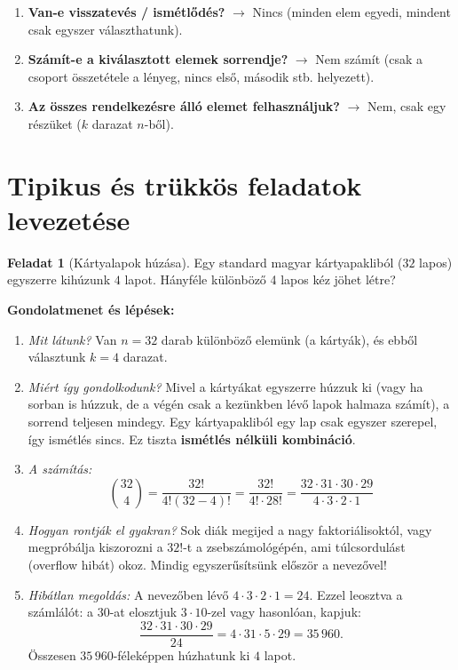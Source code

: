 \documentclass[a4paper,12pt]{article}
\newcommand{\textbfr}[1]{\textbf{\textcolor{bvred}{#1}}} %
\theoremstyle{definition} %
\newtheorem*{problem}{Feladat}
\begin{document}
\begin{enumerate}[label=\textbfr{\arabic*}.]
    \item \textbf{Van-e visszatevés / ismétlődés?} $\rightarrow$ Nincs (minden elem egyedi, mindent csak egyszer választhatunk).
    \item \textbf{Számít-e a kiválasztott elemek sorrendje?} $\rightarrow$ Nem számít (csak a csoport összetétele a lényeg, nincs első, második stb. helyezett).
    \item \textbf{Az összes rendelkezésre álló elemet felhasználjuk?} $\rightarrow$ Nem, csak egy részüket ($k$ darazat $n$-ből).
\end{enumerate}

\section{Tipikus és trükkös feladatok levezetése}

\begin{problem}[Kártyalapok húzása]
Egy standard magyar kártyapakliból ($32$ lapos) egyszerre kihúzunk $4$ lapot. Hányféle különböző 4 lapos kéz jöhet létre?
\end{problem}

\textbf{Gondolatmenet és lépések:}
\begin{enumerate}
    \item \textit{Mit látunk?} Van $n = 32$ darab különböző elemünk (a kártyák), és ebből választunk $k = 4$ darazat.
    \item \textit{Miért így gondolkodunk?} Mivel a kártyákat egyszerre húzzuk ki (vagy ha sorban is húzzuk, de a végén csak a kezünkben lévő lapok halmaza számít), a sorrend teljesen mindegy. Egy kártyapakliból egy lap csak egyszer szerepel, így ismétlés sincs. Ez tiszta \textbf{ismétlés nélküli kombináció}.
    \item \textit{A számítás:}
    $$\binom{32}{4} = \frac{32!}{4!(32-4)!} = \frac{32!}{4! \cdot 28!} = \frac{32 \cdot 31 \cdot 30 \cdot 29}{4 \cdot 3 \cdot 2 \cdot 1}$$
    \item \textit{Hogyan rontják el gyakran?} Sok diák megijed a nagy faktoriálisoktól, vagy megpróbálja kiszorozni a $32!$-t a zsebszámológépén, ami túlcsordulást (overflow hibát) okoz. Mindig egyszerűsítsünk először a nevezővel!
    \item \textit{Hibátlan megoldás:} 
    A nevezőben lévő $4 \cdot 3 \cdot 2 \cdot 1 = 24$. Ezzel leosztva a számlálót: a $30$-at elosztjuk $3 \cdot 10$-zel vagy hasonlóan, kapjuk:
    $$\frac{32 \cdot 31 \cdot 30 \cdot 29}{24} = 4 \cdot 31 \cdot 5 \cdot 29 = 35\,960.$$
    Összesen $35\,960$-féleképpen húzhatunk ki $4$ lapot.
\end{enumerate}
\end{document}
